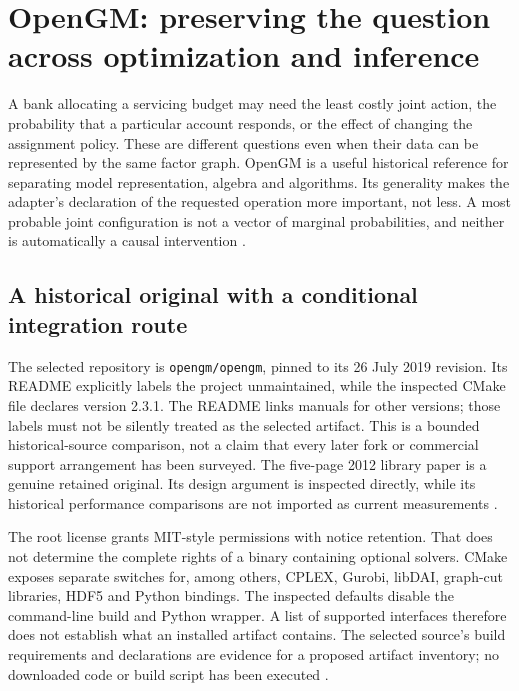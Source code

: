 \section{OpenGM: preserving the question across optimization and inference}
\label{sec:exec24-opengm-reuse}

A bank allocating a servicing budget may need the least costly joint action,
the probability that a particular account responds, or the effect of changing
the assignment policy. These are different questions even when their data
can be represented by the same factor graph. OpenGM is a useful historical
reference for separating model representation, algebra and algorithms. Its
generality makes the adapter's declaration of the requested operation more
important, not less. A most probable joint configuration is not a vector of
marginal probabilities, and neither is automatically a causal intervention
\citep{exec24_opengm_paper,exec24_opengm_source,exec24_opengm_choice}.

\subsection{A historical original with a conditional integration route}
The selected repository is \texttt{opengm/opengm}, pinned to its 26 July
2019 revision. Its README explicitly labels the project unmaintained, while
the inspected CMake file declares version 2.3.1. The README links manuals
for other versions; those labels must not be silently treated as the
selected artifact. This is a bounded historical-source comparison, not a
claim that every later fork or commercial support arrangement has been
surveyed. The five-page 2012 library paper is a genuine retained original.
Its design argument is inspected directly, while its historical performance
comparisons are not imported as current measurements
\citep{exec24_opengm_paper,exec24_opengm_source}.

The root license grants MIT-style permissions with notice retention. That
does not determine the complete rights of a binary containing optional
solvers. CMake exposes separate switches for, among others, CPLEX, Gurobi,
libDAI, graph-cut libraries, HDF5 and Python bindings. The inspected defaults
disable the command-line build and Python wrapper. A list of supported
interfaces therefore does not establish what an installed artifact contains.
The selected source's build requirements and declarations are evidence for
a proposed artifact inventory; no downloaded code or build script has been
executed \citep{exec24_opengm_source}.

